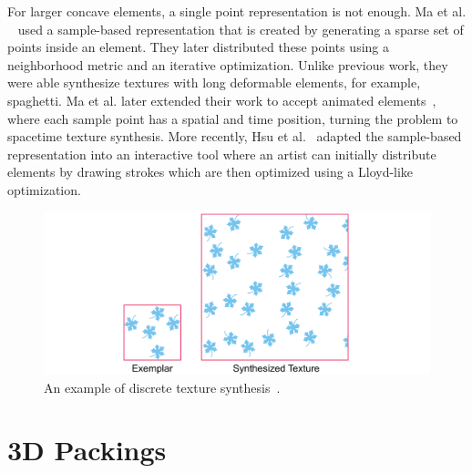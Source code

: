 \newtext
{
For larger concave elements, a single point representation is not enough.
Ma et al. ~\cite{Ma2011} used a sample-based representation that
is created by generating a sparse set of points inside an element.
They later distributed these points using a neighborhood metric and an iterative optimization.
Unlike previous work, they were able synthesize textures with long deformable elements, for example, spaghetti.
Ma et al. later extended their work to accept animated elements~\cite{Ma2013}, where
each sample point has a spatial and time position, turning the problem to spacetime texture synthesis.
More recently, Hsu et al.~\cite{Hsu2020} adapted the sample-based representation into an interactive tool
where an artist can initially distribute elements by drawing strokes
which are then optimized using a Lloyd-like optimization.
}


\begin{figure}
\centering
\includegraphics[width=1.0\textwidth]{figures/related/discrete_texture.pdf} 
\caption[A discrete texture]
{\label{fig_discrete_texture} 
\newtext
{
An example of discrete texture synthesis~\cite{AlMeraj2013}.
}
}
\end{figure}



\section{3D Packings}


